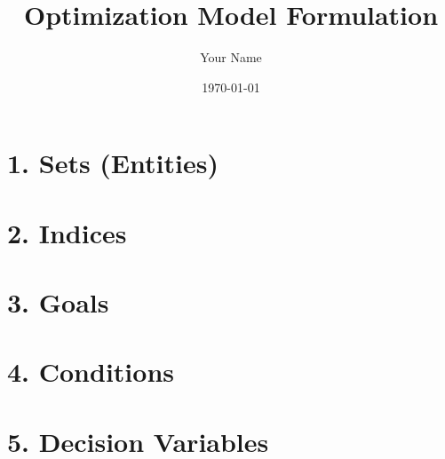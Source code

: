 \documentclass{article}
\title{Optimization Model Formulation}
\author{Your Name}
\date{\today}
\begin{document}
\maketitle

\tableofcontents
\newpage

\section{1. Sets (Entities)}
\begin{itemize}
\end{itemize}

\section{2. Indices}
\begin{itemize}
\end{itemize}

\section{3. Goals}
\begin{itemize}
\end{itemize}

\section{4. Conditions}
\begin{itemize}
\end{itemize}

\section{5. Decision Variables}
\begin{itemize}
\end{itemize}
\end{document}
